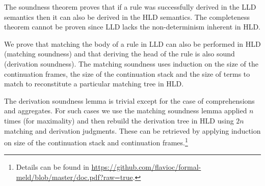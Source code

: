 The soundness theorem proves that if a rule was successfully derived in the LLD semantics then it can also be derived in the HLD semantics. The completeness theorem cannot
be proven since LLD lacks the non-determinism inherent in HLD.

We prove that matching the body of a rule in LLD can also be performed in HLD (matching soundness) and that deriving the head of the rule is also sound (derivation soundness). The matching soundness uses induction on the size of the continuation frames, the size of the continuation stack and the size of terms to match to reconstitute a particular matching tree in HLD.

The derivation soundness lemma is trivial except for the case of comprehensions and aggregates. For such cases we use the matching soundness lemma applied $n$ times (for maximality) and then rebuild the derivation tree in HLD using $2 n$ matching and derivation judgments. These can be retrieved by applying
induction on size of the continuation stack and continuation frames.\footnote{Details can be
found in \url{https://github.com/flavioc/formal-meld/blob/master/doc.pdf?raw=true}.}

